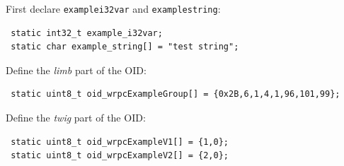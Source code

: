 \documentclass[a4paper, 12pt]{article}
\renewcommand{\_}{\underscore\allowbreak}
\begin{document}
\begin{itemize*}
\item First declare \texttt{example\_i32var} and \texttt{example\_string}:
\begin{lstlisting}
 static int32_t example_i32var;
 static char example_string[] = "test string";
\end{lstlisting}

\item Define the \textit{limb} part of the OID:
\begin{lstlisting}
 static uint8_t oid_wrpcExampleGroup[] = {0x2B,6,1,4,1,96,101,99};
\end{lstlisting}

\item Define the \textit{twig} part of the OID:
\begin{lstlisting}
 static uint8_t oid_wrpcExampleV1[] = {1,0};
 static uint8_t oid_wrpcExampleV2[] = {2,0};
\end{lstlisting}


\end{itemize*}
\end{document}
